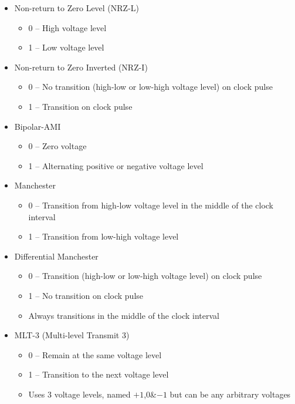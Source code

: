 \begin{itemize}
  \item Non-return to Zero Level (NRZ-L)
  \begin{itemize}
    \item 0 -- High voltage level
    \item 1 -- Low voltage level
  \end{itemize}
  \item Non-return to Zero Inverted (NRZ-I)
  \begin{itemize}
    \item 0 -- No transition (high-low or low-high voltage level) on clock pulse
    \item 1 -- Transition on clock pulse
  \end{itemize}
  \item Bipolar-AMI
  \begin{itemize}
    \item 0 -- Zero voltage
    \item 1 -- Alternating positive or negative voltage level 
  \end{itemize}
  \item Manchester
  \begin{itemize}
    \item 0 -- Transition from high-low voltage level in the middle of the clock interval
    \item 1 -- Transition from low-high voltage level
  \end{itemize}
  \item Differential Manchester
  \begin{itemize}
    \item 0 -- Transition (high-low or low-high voltage level) on clock pulse
    \item 1 -- No transition on clock pulse
    \item Always transitions in the middle of the clock interval  
  \end{itemize}
  \item MLT-3 (Multi-level Transmit 3)
  \begin{itemize}
    \item 0 -- Remain at the same voltage level
    \item 1 -- Transition to the next voltage level
    \item Uses 3 voltage levels, named $+1$,$0$\&$-1$ but can be any arbitrary voltages
  \end{itemize}
\end{itemize}

